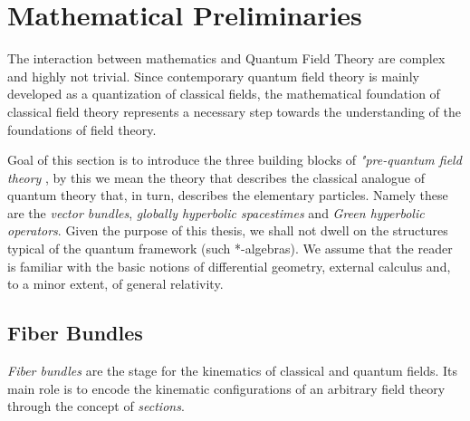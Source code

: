 \documentclass[Main]{subfiles}
\begin{document}
\chapter{Mathematical Preliminaries}
	The interaction between mathematics and Quantum Field Theory are complex and highly not trivial.
	Since contemporary quantum field theory is mainly developed as a quantization of classical fields, the mathematical foundation of classical field theory represents a necessary step towards the understanding of the foundations of field theory.
	
	Goal of this section is to introduce the three  building blocks of \emph{"pre-quantum field theory} , by this we mean the theory that describes the classical analogue of quantum theory that, in turn, describes the elementary particles.
	Namely these are the \emph{vector bundles}, \emph{globally hyperbolic spacestimes} and \emph{Green hyperbolic operators}.
	Given the purpose of this thesis, we shall not dwell on the structures typical of the quantum framework (such *-algebras).
	We assume that the reader is familiar with the basic notions of differential geometry, external calculus and, to a minor extent, of general relativity.
	\section{Fiber Bundles}
		\emph{Fiber bundles} are the stage for the kinematics of classical and quantum fields.
		Its main role is to encode the kinematic configurations of an arbitrary field theory through the concept of
		\emph{sections}.
		
\end{document}
